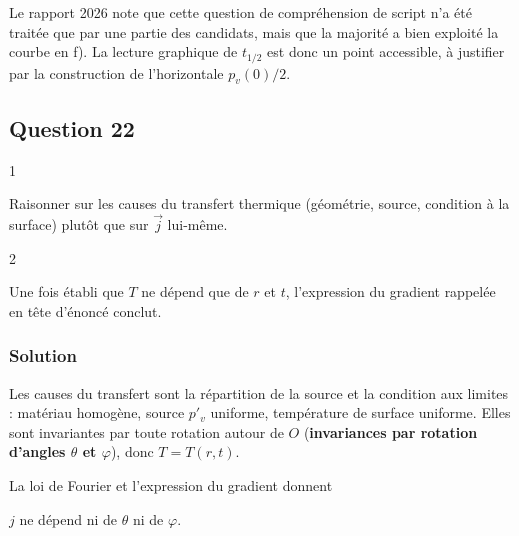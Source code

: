 \documentclass[11pt,a4paper]{article}
\newcommand{\equationajustee}[1]{%
  \sbox{\boiteequation}{$\displaystyle #1$}%
  \ifdim\wd\boiteequation>\linewidth
    \[\resizebox{\linewidth}{!}{\usebox{\boiteequation}}\]%
  \else
    \[#1\]%
  \fi}
\begin{document}
\begin{jury}

Le rapport 2026 note que cette question de compréhension de script n'a été traitée que par une partie des candidats, mais que la majorité a bien exploité la courbe en f). La lecture graphique de \(t_{1/2}\) est donc un point accessible, à justifier par la construction de l'horizontale \(p_v(0)/2\).

\end{jury}

\hypertarget{question-22}{%
\subsection{Question 22}\label{question-22}}

\begin{indication}{1}

Raisonner sur les causes du transfert thermique (géométrie, source, condition à la surface) plutôt que sur \(\vec j\) lui-même.

\end{indication}

\begin{indication}{2}

Une fois établi que \(T\) ne dépend que de \(r\) et \(t\), l'expression du gradient rappelée en tête d'énoncé conclut.

\end{indication}

\hypertarget{solution-21}{%
\subsubsection{Solution}\label{solution-21}}

Les causes du transfert sont la répartition de la source et la condition aux limites : matériau homogène, source \(p'_v\) uniforme, température de surface uniforme. Elles sont invariantes par toute rotation autour de \(O\) (\textbf{invariances par rotation d'angles \(\theta\) et \(\varphi\)}), donc \(T=T(r,t)\).

La loi de Fourier et l'expression du gradient donnent

\equationajustee{\vec j=-\lambda\,\overrightarrow{\mathrm{grad}}\,T=-\lambda\frac{\partial T}{\partial r}\,\vec u_r .}

\equationajustee{\boxed{\vec j=j(r,t)\,\vec u_r}}

\(j\) ne dépend ni de \(\theta\) ni de \(\varphi\).
\end{document}
